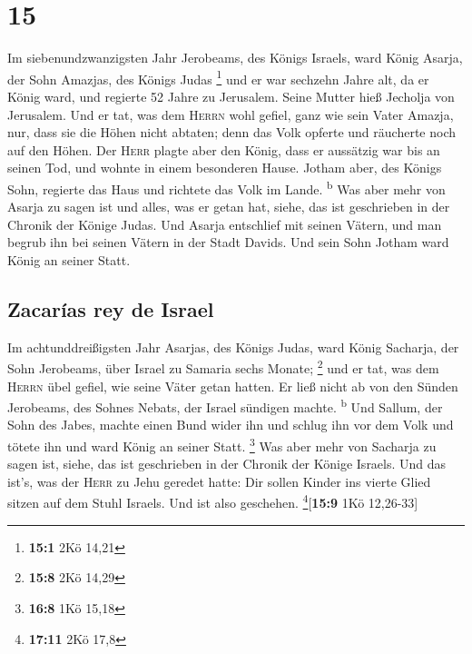 \hypertarget{section-14}{%
\section{15}\label{section-14}}

 Im siebenundzwanzigsten Jahr Jerobeams, des Königs
Israels, ward König Asarja, der Sohn Amazjas, des Königs Judas
\footnote{\textbf{15:1} 2Kö 14,21}  und er war sechzehn
Jahre alt, da er König ward, und regierte 52 Jahre zu Jerusalem. Seine
Mutter hieß Jecholja von Jerusalem.  Und er tat, was dem
\textsc{Herrn} wohl gefiel, ganz wie sein Vater Amazja, 
nur, dass sie die Höhen nicht abtaten; denn das Volk opferte und
räucherte noch auf den Höhen.  Der \textsc{Herr} plagte
aber den König, dass er aussätzig war bis an seinen Tod, und wohnte in
einem besonderen Hause. Jotham aber, des Königs Sohn, regierte das Haus
und richtete das Volk im Lande. \textsuperscript{b}  Was
aber mehr von Asarja zu sagen ist und alles, was er getan hat, siehe,
das ist geschrieben in der Chronik der Könige Judas.  Und
Asarja entschlief mit seinen Vätern, und man begrub ihn bei seinen
Vätern in der Stadt Davids. Und sein Sohn Jotham ward König an seiner
Statt.

\hypertarget{zacaruxedas-rey-de-israel}{%
\subsection{Zacarías rey de Israel}\label{zacaruxedas-rey-de-israel}}

 Im achtunddreißigsten Jahr Asarjas, des Königs Judas,
ward König Sacharja, der Sohn Jerobeams, über Israel zu Samaria sechs
Monate; \footnote{\textbf{15:8} 2Kö 14,29}  und er tat,
was dem \textsc{Herrn} übel gefiel, wie seine Väter getan hatten. Er
ließ nicht ab von den Sünden Jerobeams, des Sohnes Nebats, der Israel
sündigen machte. \textsuperscript{b}  Und Sallum, der
Sohn des Jabes, machte einen Bund wider ihn und schlug ihn vor dem Volk
und tötete ihn und ward König an seiner Statt. \footnote{\textbf{16:8}
  1Kö 15,18}  Was aber mehr von Sacharja zu sagen ist,
siehe, das ist geschrieben in der Chronik der Könige Israels.
 Und das ist's, was der \textsc{Herr} zu Jehu geredet
hatte: Dir sollen Kinder ins vierte Glied sitzen auf dem Stuhl Israels.
Und ist also geschehen. \footnote{\textbf{17:11} 2Kö 17,8}{[}\textbf{15:9}
1Kö 12,26-33{]}

